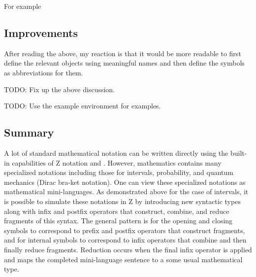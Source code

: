 \documentclass[11pt, oneside]{article}
\begin{document}
For example

\begin{zed}
	\zeroR \in \closedLowerBound \zeroR \intersectRightLeft \oneR \openUpperBound
\end{zed}

\subsection{Improvements}

After reading the above, my reaction is that it would be more readable to first define the relevant objects using meaningful names
and then define the symbols as abbreviations for them.

TODO: Fix up the above discussion.

TODO: Use the example environment for examples.

\subsection{Summary}

A lot of standard mathematical notation can be written directly using the built-in capabilities of Z notation and \fuzz.
However, mathematics contains many specialized notations including those for intervals, probability, and quantum mechanics (Dirac bra-ket notation).
One can view these specialized notations as mathematical mini-languages.
As demonstrated above for the case of intervals, it is possible to simulate these notations in Z by introducing new syntactic types along with infix and postfix operators that construct, combine, and reduce fragments of this syntax.
The general pattern is for the opening and closing symbols to correspond to prefix and postfix operators that
construct fragments, and for internal symbols to correspond to infix operators that combine and then finally 
reduce fragments.
Reduction occurs when the final infix operator is applied and maps the completed mini-language sentence to a 
some usual mathematical type.

\printbibliography
\end{document}
